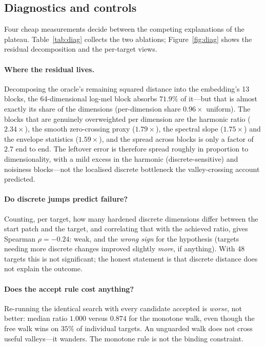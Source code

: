 \documentclass[11pt]{article}
\begin{document}
\subsection{Diagnostics and controls}\label{sec:res-diagnostics}

Four cheap measurements decide between the competing explanations of the
plateau.  Table~\ref{tab:diag} collects the two ablations; Figure~\ref{fig:diag}
shows the residual decomposition and the per-target views.

\paragraph{Where the residual lives.}  Decomposing the oracle's remaining
squared distance into the embedding's 13 blocks, the 64-dimensional log-mel
block absorbs $71.9\%$ of it---but that is almost exactly its share of the
dimensions (per-dimension share $0.96\times$ uniform).  The blocks that are
genuinely overweighted per dimension are the harmonic ratio
($2.34\times$), the smooth zero-crossing proxy ($1.79\times$), the spectral
slope ($1.75\times$) and the envelope statistics ($1.59\times$), and the
spread across blocks is only a factor of $2.7$ end to end.  The leftover error
is therefore spread roughly in proportion to dimensionality, with a mild excess
in the harmonic (discrete-sensitive) and noisiness blocks---not the localised
discrete bottleneck the valley-crossing account predicted.

\paragraph{Do discrete jumps predict failure?}  Counting, per target, how many
hardened discrete dimensions differ between the start patch and the target, and
correlating that with the achieved ratio, gives Spearman $\rho = -0.24$: weak,
and the \emph{wrong sign} for the hypothesis (targets needing more discrete
changes improved slightly \emph{more}, if anything).  With 48 targets this is
not significant; the honest statement is that discrete distance does not explain
the outcome.

\paragraph{Does the accept rule cost anything?}  Re-running the identical search
with every candidate accepted is \emph{worse}, not better: median ratio $1.000$
versus $0.874$ for the monotone walk, even though the free walk wins on $35\%$
of individual targets.  An unguarded walk does not cross useful valleys---it
wanders.  The monotone rule is not the binding constraint.
\end{document}
